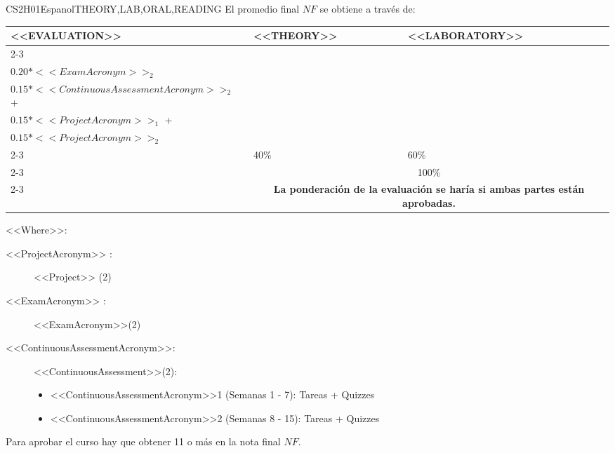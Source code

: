     \begin{evaluation}{CS2H01}{Espanol}{THEORY,LAB,ORAL,READING}
    El promedio final $NF$ se obtiene a través de:
   
    \begin{tabularx}{0.9\textwidth}{|X|p{}|p{}|} \hline
    \multirow{4}{*}{\uppercase{<<Evaluation>>}} & \uppercase{<<Theory>>} & \uppercase{<<Laboratory>>} \\ \cline{2-3}
    & %
        \begin{minipage}{0.95\textwidth}
        \begin{tabular}{l}
            $0.20*<<ExamAcronym>>_{1}$  + \\
            $0.20*<<ExamAcronym>>_{2}$  
        \end{tabular} 
        \end{minipage} 
    & %
        \begin{minipage}{0.95\textwidth}
        \begin{tabular}{l}
            $0.15*<<ContinuousAssessmentAcronym>>_{1}$  + \\
            $0.15*<<ContinuousAssessmentAcronym>>_{2}$  + \\
            $0.15*<<ProjectAcronym>>_{1}$  + \\
            $0.15*<<ProjectAcronym>>_{2}$ 
        \end{tabular} 
        \end{minipage}                 \\ \cline{2-3}
    
    & %
    40\% 
    & %
    60\% \\ \cline{2-3}
    & \multicolumn{2}{c|}{100\%}  \\ \cline{2-3}
    & \multicolumn{2}{c|}{\textbf{La ponderación de la evaluación se haría si ambas partes están aprobadas.}}  \\ \hline
    \end{tabularx}
      
    \vspace{2mm}
    \noindent <<Where>>:
    \begin{description}
        \item[<<ProjectAcronym>> :] <<Project>> (2)
        \item[<<ExamAcronym>> :] <<ExamAcronym>>(2)
        \item[<<ContinuousAssessmentAcronym>>:]<<ContinuousAssessment>>(2):
        \begin{itemize}
            \item <<ContinuousAssessmentAcronym>>1 (Semanas 1 - 7): Tareas + Quizzes
            \item <<ContinuousAssessmentAcronym>>2 (Semanas 8 - 15): Tareas + Quizzes
        \end{itemize}
    \end{description}
    
    \noindent Para aprobar el curso hay que obtener 11 o más en la nota final $NF$.
    \end{evaluation}
   
